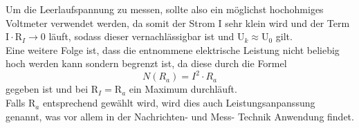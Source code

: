 \noindent Um die Leerlaufspannung zu messen, sollte also ein möglichst hochohmiges Voltmeter
verwendet werden, da somit der Strom I sehr klein wird und der Term
$ \text{I}\cdot \text{R}_I \to 0 $ läuft, sodass dieser vernachlässigbar ist und
$ \text{U}_k \approx \text{U}_0 $ gilt. \\
\noindent Eine weitere Folge ist, dass die entnommene elektrische Leistung nicht
beliebig hoch werden kann sondern begrenzt ist, da diese durch die Formel
\begin{equation}
  N(R_a) = I^2 \cdot R_a
\end{equation}
gegeben ist und bei $\text{R}_I = \text{R}_a$ ein Maximum durchläuft. \\
\noindent Falls $\text{R}_a$ entsprechend gewählt wird, wird dies auch
Leistungsanpanssung genannt, was vor allem in der Nachrichten- und Mess-
Technik Anwendung findet.
